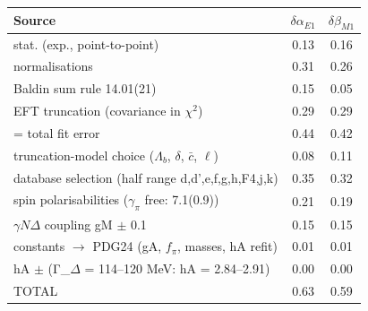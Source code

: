 \begin{tabular}{lcc}
\hline
Source & $\delta\alpha_{E1}$ & $\delta\beta_{M1}$ \\
\hline
stat. (exp., point-to-point) & 0.13 & 0.16 \\
normalisations & 0.31 & 0.26 \\
Baldin sum rule 14.01(21) & 0.15 & 0.05 \\
EFT truncation (covariance in $\chi^2$) & 0.29 & 0.29 \\
= total fit error & 0.44 & 0.42 \\
truncation-model choice ($\Lambda_b$, $\delta$, $\bar c$, $\ell$) & 0.08 & 0.11 \\
database selection (half range d,d',e,f,g,h,F4,j,k) & 0.35 & 0.32 \\
spin polarisabilities ($\gamma_\pi$ free: 7.1(0.9)) & 0.21 & 0.19 \\
$\gamma N\Delta$ coupling gM $\pm$ 0.1 & 0.15 & 0.15 \\
constants $\to$ PDG24 (gA, $f_\pi$, masses, hA refit) & 0.01 & 0.01 \\
hA $\pm$ (Γ\_$\Delta$ = 114–120 MeV: hA = 2.84–2.91) & 0.00 & 0.00 \\
TOTAL & 0.63 & 0.59 \\
\hline
\end{tabular}

